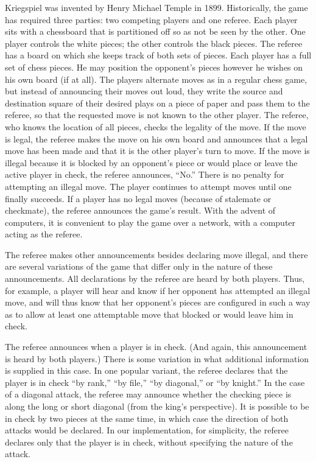 \documentclass[11pt]{article}
\begin{document}
Kriegspiel was invented by Henry Michael Temple in 1899.  Historically, the game has required three parties: two
competing players and one referee.  Each player sits with a chessboard that is partitioned off so as not be seen by the
other.  One player controls the white pieces; the other controls the black pieces.  The referee has a board on which she
keeps track of both sets of pieces.  Each player has a full set of chess pieces.  He may position the opponent's pieces
however he wishes on his own board (if at all).  The players alternate moves as in a regular chess game, but instead of
announcing their moves out loud, they write the source and destination square of their desired plays on a piece of paper
and pass them to the referee, so that the requested move is not known to the other player. The referee, who knows the location of
all pieces, checks the legality of the move.  If the move is legal, the referee makes the move on his own board and
announces that a legal move has been made and that it is the other player's turn to move.  If the move is illegal
because it is blocked by an opponent's piece or would place or leave the active player in check, the referee announces,
``No.''  There is no penalty for attempting an illegal move.  The player continues to attempt moves until one finally
succeeds.  If a player has no legal moves (because of stalemate or checkmate), the referee announces the game's result.
With the advent of computers, it is convenient to play the game over a network, with a computer acting as the referee.

The referee makes other announcements besides declaring move illegal, and there are several variations of the game that
differ only in the nature of these announcements.  All declarations by the referee are heard by both players.  Thus, for
example, a player will hear and know if her opponent has attempted an illegal move, and will thus know that her
opponent's pieces are configured in such a way as to allow at least one attemptable move that blocked or would leave him
in check.  

The referee announces when a player is in check.  (And again, this announcement is heard by both players.)  There is
some variation in what additional information is supplied in this case.  In one popular variant, the referee declares
that the player is in check ``by rank,'' ``by file,'' ``by diagonal,'' or ``by knight.''  In the case of a diagonal attack, the
referee may announce whether the checking piece is along the long or short diagonal (from the king's perspective).  It
is possible to be in check by two pieces at the same time, in which case the direction of both attacks would be
declared.  In our implementation, for simplicity, the referee declares only that the player is in check, without
specifying the nature of the attack.
\end{document}
